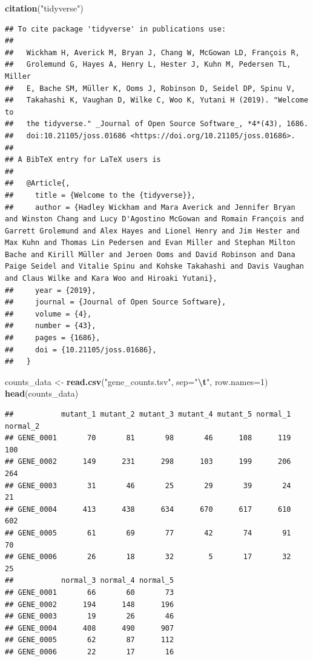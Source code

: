 \documentclass[
]{article}
\newenvironment{Shaded}{\begin{snugshade}}{\end{snugshade}}
\newcommand{\AttributeTok}[1]{\textcolor[rgb]{0.13,0.29,0.53}{#1}}
\newcommand{\DecValTok}[1]{\textcolor[rgb]{0.00,0.00,0.81}{#1}}
\newcommand{\FunctionTok}[1]{\textcolor[rgb]{0.13,0.29,0.53}{\textbf{#1}}}
\newcommand{\NormalTok}[1]{#1}
\newcommand{\OtherTok}[1]{\textcolor[rgb]{0.56,0.35,0.01}{#1}}
\newcommand{\SpecialCharTok}[1]{\textcolor[rgb]{0.81,0.36,0.00}{\textbf{#1}}}
\newcommand{\StringTok}[1]{\textcolor[rgb]{0.31,0.60,0.02}{#1}}
\begin{document}
\begin{Shaded}
\begin{Highlighting}[]
\FunctionTok{citation}\NormalTok{(}\StringTok{"tidyverse"}\NormalTok{)}
\end{Highlighting}
\end{Shaded}

\begin{verbatim}
## To cite package 'tidyverse' in publications use:
## 
##   Wickham H, Averick M, Bryan J, Chang W, McGowan LD, François R,
##   Grolemund G, Hayes A, Henry L, Hester J, Kuhn M, Pedersen TL, Miller
##   E, Bache SM, Müller K, Ooms J, Robinson D, Seidel DP, Spinu V,
##   Takahashi K, Vaughan D, Wilke C, Woo K, Yutani H (2019). "Welcome to
##   the tidyverse." _Journal of Open Source Software_, *4*(43), 1686.
##   doi:10.21105/joss.01686 <https://doi.org/10.21105/joss.01686>.
## 
## A BibTeX entry for LaTeX users is
## 
##   @Article{,
##     title = {Welcome to the {tidyverse}},
##     author = {Hadley Wickham and Mara Averick and Jennifer Bryan and Winston Chang and Lucy D'Agostino McGowan and Romain François and Garrett Grolemund and Alex Hayes and Lionel Henry and Jim Hester and Max Kuhn and Thomas Lin Pedersen and Evan Miller and Stephan Milton Bache and Kirill Müller and Jeroen Ooms and David Robinson and Dana Paige Seidel and Vitalie Spinu and Kohske Takahashi and Davis Vaughan and Claus Wilke and Kara Woo and Hiroaki Yutani},
##     year = {2019},
##     journal = {Journal of Open Source Software},
##     volume = {4},
##     number = {43},
##     pages = {1686},
##     doi = {10.21105/joss.01686},
##   }
\end{verbatim}

\begin{Shaded}
\begin{Highlighting}[]
\NormalTok{counts\_data }\OtherTok{\textless{}{-}} \FunctionTok{read.csv}\NormalTok{(}\StringTok{"gene\_counts.tsv"}\NormalTok{,}
                        \AttributeTok{sep=}\StringTok{"}\SpecialCharTok{\textbackslash{}t}\StringTok{"}\NormalTok{, }\AttributeTok{row.names=}\DecValTok{1}\NormalTok{)}
\FunctionTok{head}\NormalTok{(counts\_data)}
\end{Highlighting}
\end{Shaded}

\begin{verbatim}
##           mutant_1 mutant_2 mutant_3 mutant_4 mutant_5 normal_1 normal_2
## GENE_0001       70       81       98       46      108      119      100
## GENE_0002      149      231      298      103      199      206      264
## GENE_0003       31       46       25       29       39       24       21
## GENE_0004      413      438      634      670      617      610      602
## GENE_0005       61       69       77       42       74       91       70
## GENE_0006       26       18       32        5       17       32       25
##           normal_3 normal_4 normal_5
## GENE_0001       66       60       73
## GENE_0002      194      148      196
## GENE_0003       19       26       46
## GENE_0004      408      490      907
## GENE_0005       62       87      112
## GENE_0006       22       17       16
\end{verbatim}
\end{document}
